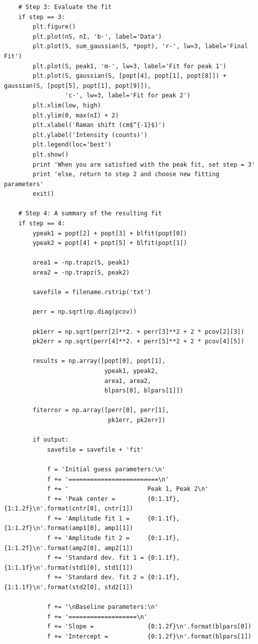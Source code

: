 \documentclass[journal=jpccck,manuscript=suppinfo,email=true]{achemso}
\begin{document}
\begin{verbatim}
    # Step 3: Evaluate the fit
    if step == 3:
        plt.figure()
        plt.plot(nS, nI, 'b-', label='Data')
        plt.plot(S, sum_gaussian(S, *popt), 'r-', lw=3, label='Final Fit')
        plt.plot(S, peak1, 'm-', lw=3, label='Fit for peak 1')
        plt.plot(S, gaussian(S, [popt[4], popt[1], popt[8]]) + gaussian(S, [popt[5], popt[1], popt[9]]),
                 'c-', lw=3, label='Fit for peak 2')
        plt.xlim(low, high)
        plt.ylim(0, max(nI) + 2)
        plt.xlabel('Raman shift (cm$^{-1}$)')
        plt.ylabel('Intensity (counts)')
        plt.legend(loc='best')
        plt.show()
        print 'When you are satisfied with the peak fit, set step = 3'
        print 'else, return to step 2 and choose new fitting parameters'
        exit()

    # Step 4: A summary of the resulting fit
    if step == 4:
        ypeak1 = popt[2] + popt[3] + blfit(popt[0])
        ypeak2 = popt[4] + popt[5] + blfit(popt[1])

        area1 = -np.trapz(S, peak1)
        area2 = -np.trapz(S, peak2)

        savefile = filename.rstrip('txt')

        perr = np.sqrt(np.diag(pcov))

        pk1err = np.sqrt(perr[2]**2. + perr[3]**2 + 2 * pcov[2][3])
        pk2err = np.sqrt(perr[4]**2. + perr[5]**2 + 2 * pcov[4][5])

        results = np.array([popt[0], popt[1],
                            ypeak1, ypeak2,
                            area1, area2,
                            blpars[0], blpars[1]])

        fiterror = np.array([perr[0], perr[1],
                             pk1err, pk2err])

        if output:
            savefile = savefile + 'fit'

            f = 'Initial guess parameters:\n'
            f += '=========================\n'
            f += '                      Peak 1, Peak 2\n'
            f += 'Peak center =         {0:1.1f}, {1:1.2f}\n'.format(cntr[0], cntr[1])
            f += 'Amplitude fit 1 =     {0:1.1f}, {1:1.2f}\n'.format(amp1[0], amp1[1])
            f += 'Amplitude fit 2 =     {0:1.1f}, {1:1.2f}\n'.format(amp2[0], amp2[1])
            f += 'Standard dev. fit 1 = {0:1.1f}, {1:1.1f}\n'.format(std1[0], std1[1])
            f += 'Standard dev. fit 2 = {0:1.1f}, {1:1.1f}\n'.format(std2[0], std2[1])

            f += '\nBaseline parameters:\n'
            f += '===================\n'
            f += 'Slope =               {0:1.2f}\n'.format(blpars[0])
            f += 'Intercept =           {0:1.2f}\n'.format(blpars[1])


\end{verbatim}
\end{document}
